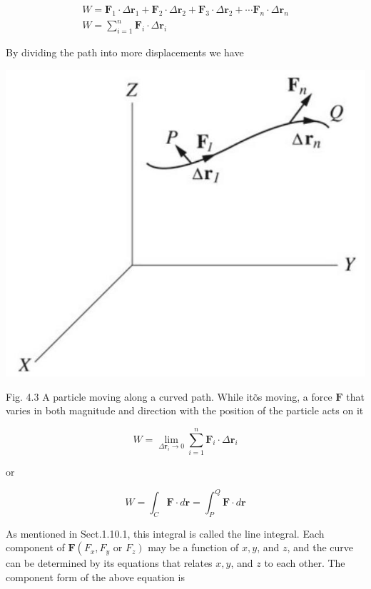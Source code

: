 \documentclass[10pt]{article}
\begin{document}
$$
\begin{gathered}
W=\mathbf{F}_{1} \cdot \Delta \mathbf{r}_{1}+\mathbf{F}_{2} \cdot \Delta \mathbf{r}_{2}+\mathbf{F}_{3} \cdot \Delta \mathbf{r}_{2}+\cdots \mathbf{F}_{n} \cdot \Delta \mathbf{r}_{n} \\
W=\sum_{i=1}^{n} \mathbf{F}_{i} \cdot \Delta \mathbf{r}_{i}
\end{gathered}
$$

By dividing the path into more displacements we have

\begin{center}
\includegraphics[max width=\textwidth]{2024_09_13_db1f357d2aad0a03eb2eg-064(2)}
\end{center}

Fig. 4.3 A particle moving along a curved path. While itõs moving, a force $\mathbf{F}$ that varies in both magnitude and direction with the position of the particle acts on it

$$
W=\lim _{\Delta \mathbf{r}_{i} \rightarrow 0} \sum_{i=1}^{n} \mathbf{F}_{i} \cdot \Delta \mathbf{r}_{i}
$$

or

$$
W=\int_{C} \mathbf{F} \cdot d \mathbf{r}=\int_{P}^{Q} \mathbf{F} \cdot d \mathbf{r}
$$

As mentioned in Sect.1.10.1, this integral is called the line integral. Each component of $\mathbf{F}\left(F_{x}, F_{y}\right.$ or $\left.F_{z}\right)$ may be a function of $x, y$, and $z$, and the curve can be determined by its equations that relates $x, y$, and $z$ to each other. The component form of the above equation is
\end{document}
